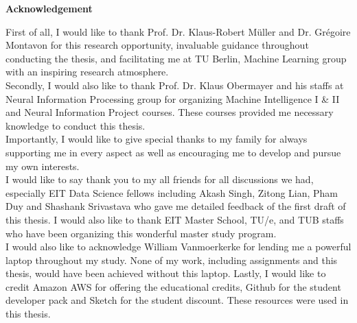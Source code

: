\thispagestyle{empty}
\vspace*{3cm}
\begin{center}
    \textbf{Acknowledgement}
\end{center}

\noindent
First of all, I would like to thank Prof. Dr. Klaus-Robert M\"{u}ller and Dr. Gr\'{e}goire Montavon for this research opportunity, invaluable guidance throughout conducting the thesis, and facilitating me at TU Berlin, Machine Learning group with an inspiring research atmosphere.
\\

\noindent
Secondly, I would also like to thank Prof. Dr. Klaus Obermayer and his staffs at Neural Information Processing group for organizing Machine Intelligence I \& II and Neural Information Project courses. These courses provided me necessary knowledge to conduct this thesis.
\\

\noindent
Importantly, I would like to give special thanks to my family for always supporting me in every aspect as well as encouraging me to develop and pursue my own interests.
\\

\noindent
I would like to say thank you to my all friends for all discussions we had, especially EIT Data Science fellows including Akash Singh, Zitong Lian, Pham Duy and Shashank Srivastava who gave me detailed feedback of the first draft of this thesis. I would also like to thank EIT Master School, TU/e, and TUB staffs who have been organizing this wonderful master study program.
\\

\noindent
I would also like to acknowledge William Vanmoerkerke for lending me a powerful laptop throughout my study. None of my work, including assignments and this thesis, would have been achieved without this laptop.  Lastly, I would like to credit Amazon AWS for offering the educational credits, Github for the student developer pack and Sketch for the student discount. These resources were used in this thesis.